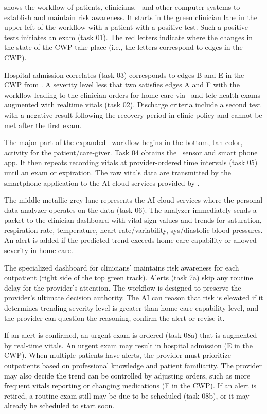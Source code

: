  shows the workflow of patients, clinicians, \phware\ and other computer systems to establish and maintain risk awareness. It starts in the green clinician lane in the upper left of the workflow with a patient with a positive test. Such a positive tests initiates an exam (task 01). The red letters indicate where the changes in the state of the CWP take place (i.e., the letters correspond to edges in the CWP). 

Hospital admission correlates (task 03) corresponds to edges B and E in the CWP from . A severity level less that two satisfies edges A and F with the workflow leading to the clinician orders for home care via \phware\ and tele-health exams augmented with realtime vitals (task 02). Discharge criteria include a second test with a negative result following the recovery period in clinic policy and cannot be met after the first exam.

The major part of the expanded \phware\ workflow begins in the bottom, tan color, activity for the patient/care-giver. Task 04 obtains the \phware\ sensor and smart phone app. It then repeats recording vitals at provider-ordered time intervals (task 05) until an exam or expiration. The raw vitals data are transmitted by the smartphone application to the AI cloud services provided by \phware. 

The middle metallic grey lane represents the AI cloud services where the personal data analyzer operates on the data (task 06).  The analyzer immediately sends a packet to the clinician dashboard with vital sign values and trends for saturation, respiration rate, temperature, heart rate/variability, sys/diastolic blood pressures. An alert is added if the predicted trend exceeds home care capability or allowed severity in home care.

The specialized dashboard for clinicians’ maintains risk awareness for each outpatient (right side of the top green track). Alerts (task 7a) skip any routine delay for the provider’s attention. The workflow is designed to preserve the provider’s ultimate decision authority. The AI can reason that risk is elevated if it determines trending severity level is greater than home care capability level, and the provider can question the reasoning, confirm the alert or revise it. 

If an alert is confirmed, an urgent exam is ordered (task 08a) that is augmented by real-time vitals. An urgent exam may result in hospital admission (E in the CWP). When multiple patients have alerts, the provider must prioritize outpatients based on professional knowledge and patient familiarity. The provider may also decide the trend can be controlled by adjusting orders, such as more frequent vitals reporting or changing medications (F in the CWP). If an alert is retired, a routine exam still may be due to be scheduled (task 08b), or it may already be scheduled to start soon. 

